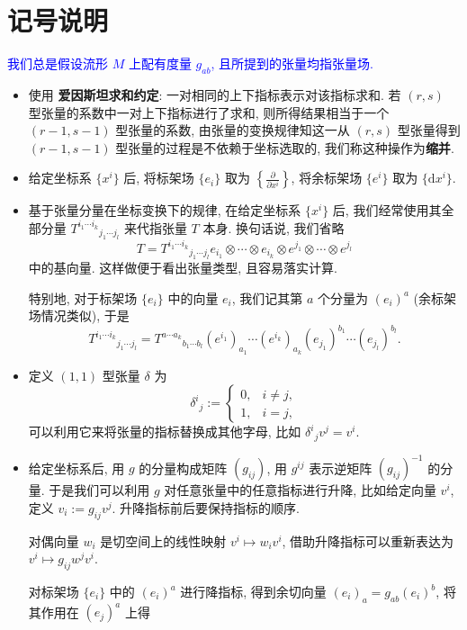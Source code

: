 \section{记号说明}
\textcolor{blue}{我们总是假设流形 $M$ 上配有度量 $g_{ab}$, 且所提到的张量均指张量场.}
\label{notation}
\begin{itemize}
    \item 使用 {\bf 爱因斯坦求和约定}: 一对相同的上下指标表示对该指标求和. 若 $(r,s)$ 型张量的系数中一对上下指标进行了求和, 则所得结果相当于一个 $(r-1,s-1)$ 型张量的系数, 由张量的变换规律知这一从 $(r,s)$ 型张量得到 $(r-1,s-1)$ 型张量的过程是不依赖于坐标选取的, 我们称这种操作为{\bf 缩并}.
    \item 给定坐标系 $\{x^i\}$ 后, 将标架场 $\{e_i\}$ 取为 $\displaystyle\left\{ \frac{\partial }{\partial x^i} \right\}$, 将余标架场 $\{e^i\}$ 取为 $\{\mathrm{d}x^i\}$.
    \item 基于张量分量在坐标变换下的规律, 在给定坐标系 $\{x^i\}$ 后, 我们经常使用其全部分量 $T^{i_1\cdots i_k}{}_{j_1\cdots j_l}$ 来代指张量 $T$ 本身. 换句话说, 我们省略
	\[ T=T^{i_1\cdots i_k}{}_{j_1\cdots j_l}e_{i_1}\otimes\cdots\otimes e_{i_k}\otimes e^{j_1}\otimes\cdots\otimes e^{j_l} \]
	中的基向量. 这样做便于看出张量类型, 且容易落实计算.
	\begin{remark}
		特别地, 对于标架场 $\{e_i\}$ 中的向量 $e_{i}$, 我们记其第 $a$ 个分量为 $ (e_{i})^{a} $ (余标架场情况类似), 于是
		\[ T^{i_1\cdots i_k}{}_{j_1\cdots j_l}=T^{a\cdots a_k}{}_{b_1\cdots b_l}(e^{i_1})_{a_1}\cdots(e^{i_k})_{a_k}(e_{j_1})^{b_1}\cdots(e_{j_l})^{b_l}. \] 
	\end{remark}
	\item 定义 $(1,1)$ 型张量 $\delta$ 为
    \[ \delta^{i}{}_{j}:=\begin{cases}
            0, & i\neq j,\\ 1, & i=j,
        \end{cases}  \]
    可以利用它来将张量的指标替换成其他字母, 比如 $\delta^{i}{}_{j}v^{j}=v^{i}$.
    \item 给定坐标系后, 用 $g$ 的分量构成矩阵 $(g_{ij})$, 用 $g^{ij}$ 表示逆矩阵 $(g_{ij})^{-1}$ 的分量. 于是我们可以利用 $g$ 对任意张量中的任意指标进行升降, 比如给定向量 $v^i$, 定义 $ v_i:=g_{ij}v^j $. 升降指标前后要保持指标的顺序.
    \begin{remark}
		对偶向量 $w_i$ 是切空间上的线性映射 $v^i\mapsto w_i v^i$, 借助升降指标可以重新表达为 $v^i\mapsto g_{ij}w^j v^i$.
	\end{remark}
	\begin{remark}
		对标架场 $\{e_i\}$ 中的 $(e_i)^{a}$ 进行降指标, 得到余切向量 $(e_i)_{a}=g_{ab}(e_i)^{b}$, 将其作用在 $(e_j)^{a}$ 上得

\end{remark}
\end{itemize}
